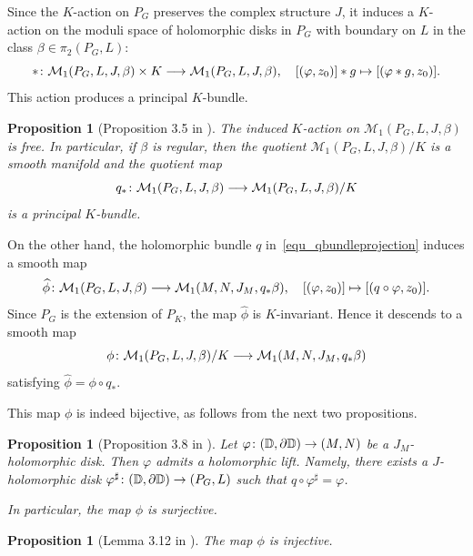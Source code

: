 \documentclass[11pt]{amsart}
\theoremstyle{plain}
\newtheorem{proposition}[theorem]{Proposition}
\theoremstyle{definition}
\theoremstyle{remark}
\numberwithin{equation}{section} \numberwithin{table}{section}
\def\to{\mathchoice{\longrightarrow}{\rightarrow}{\rightarrow}{\rightarrow}}
\numberwithin{equation}{section}
\begin{document}
Since the $K$-action on $P_G$ preserves the complex structure $J$, it induces a $K$-action on the moduli space of holomorphic disks in $P_G$ with boundary on $L$ in the class $\beta \in \pi_2(P_G, L) \colon$
$$
* \colon \mathcal{M}_1(P_{G}, L, J, \beta) \times K \to \mathcal{M}_1(P_{G}, L, J, \beta), \quad [(\varphi, z_0)] * g \mapsto  [(\varphi * g, z_0)].
$$
This action produces a principal $K$-bundle.

\begin{proposition}[Proposition 3.5 in \cite{Kim26}]\label{proposition_freemoduli}
The induced $K$-action on $\mathcal{M}_1(P_G, L, J, \beta)$ is free. In particular, if $\beta$ is regular, then the quotient $\mathcal{M}_1(P_G, L, J, \beta)/K$ is a smooth manifold and the quotient map
$$
q_* \colon \mathcal{M}_1(P_G, L, J, \beta) \to \mathcal{M}_1(P_G, L, J, \beta)/K
$$
is a principal $K$-bundle.
\end{proposition}

On the other hand, the holomorphic bundle $q$ in~\eqref{equ_qbundleprojection} induces a smooth map
$$
\widehat{\phi} \colon  \mathcal{M}_1(P_{G}, L, J, \beta) \to \mathcal{M}_1(M, N, J_M, q_* \beta), \quad [(\varphi, z_0)] \mapsto  [(q \circ \varphi, z_0)]. 
$$
Since $P_{G}$ is the extension of $P_K$, the map $\widehat{\phi}$ is $K$-invariant. Hence it descends to a smooth map
\begin{equation}\label{equ_inducedmap}
\phi \colon  \mathcal{M}_1(P_{G},L,J,\beta)/K \to \mathcal{M}_1(M, N, J_M, q_* \beta)
\end{equation}
satisfying $ \widehat{\phi} = \phi \circ q_*$.

This map $\phi$ is indeed bijective, as follows from the next two propositions.

\begin{proposition}[Proposition 3.8 in \cite{Kim26}]\label{proposition_liftingholo}
Let $\varphi \colon (\mathbb{D},\partial \mathbb{D}) \to (M,N)$ be a $J_M$-holomorphic disk. Then $\varphi$ admits a holomorphic lift. Namely, there exists a $J$-holomorphic disk $\varphi^\sharp \colon (\mathbb{D},\partial \mathbb{D}) \to (P_{G},L)$ such that $q \circ \varphi^\sharp = \varphi$.

In particular, the map $\phi$ is surjective.
\end{proposition}

\begin{proposition}[Lemma 3.12 in \cite{Kim26}]\label{proposition_injective}
The map $\phi$ is injective.
\end{proposition}
\end{document}
